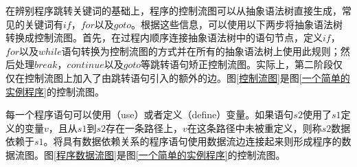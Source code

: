 在辨别程序跳转关键词的基础上，程序的控制流图可以从抽象语法树直接生成，常见的关键词有$if$，$for$以及$goto$。根据这些信息，可以使用以下两步将抽象语法树转换成控制流图。首先，在过程内顺序连接抽象语法树中的语句节点，定义$if$，$for$以及$while$语句转换为控制流图的方式并在所有的抽象语法树上使用此规则；然后处理$break$，$continue$以及$goto$等跳转语句矫正控制流图。实际上，第二阶段仅仅在控制流图上加入了由跳转语句引入的额外的边。图\ref{控制流图}是图\ref{一个简单的实例程序}的控制流图。

每一个程序语句可以使用（use）或者定义（define）变量。如果语句$s2$使用了$s1$定义的变量$v$，且从$s1$到$s2$存在一条路径上，$v$在这条路径中未被重定义，则称$s2$数据依赖于$s1$。将具有数据依赖关系的程序语句使用数据流边连接起来则形成程序的数据流图。图\ref{程序数据流图}是图\ref{一个简单的实例程序}的控制流图。






%

